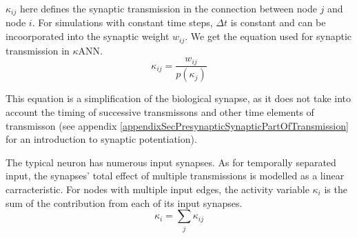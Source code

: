 		$\kappa_{ij}$ here defines the synaptic transmission in the connection between node $j$ and node $i$.
		For simulations with constant time steps, $\Delta t$ is constant and can be incoorporated into the synaptic weight $w_{ij}$.
		We get the equation used for synaptic transmission in $\kappa$ANN.
		\begin{equation}
			\kappa_{ij} = \frac{ w_{ij} }{ p(\kappa_j)}
			\label{eqSynapticTransmissionForKANN}
		\end{equation}

		This equation is a simplification of the biological synapse, as it does not take into account the timing of successive transmissons and other time elements of transmisson 
			(see appendix \ref{appendixSecPresynapticSynapticPartOfTransmission} for an introduction to synaptic potentiation). 

		The typical neuron has numerous input synapses. 
		As for temporally separated input, the synapses' total effect of multiple transmissions is modelled as a linear carracteristic. %
		For nodes with multiple input edges, the activity variable $\kappa_i$ is the sum of the contribution from each of its input synapses.
		\begin{equation}
			\kappa_i = \sum_j{\kappa_{ij}}
			\label{eqSumOfKij}
		\end{equation}

